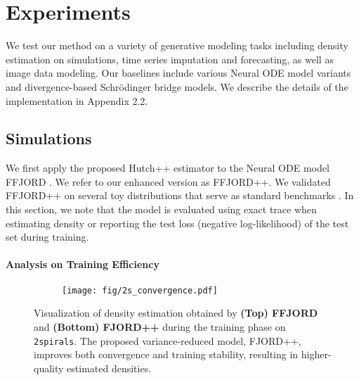 \section{Experiments}
We test our method on a variety of generative modeling tasks including density estimation on simulations, time series imputation and forecasting, as well as image data modeling. 
Our baselines include various Neural ODE model variants and divergence-based Schrödinger bridge models. We describe the details of the implementation in Appendix 2.2.

\subsection{Simulations}\label{sec: exp_simulation}
We first apply the proposed Hutch++ estimator to the Neural ODE model FFJORD \citep{FFJORD}. We refer to our enhanced version as FFJORD++.
We validated FFJORD++ on several toy distributions that serve as standard benchmarks \citep{FFJORD, wehenkel2019simulations1}. 
In this section, we note that the model is evaluated using exact trace when estimating density or reporting the test loss (negative log-likelihood) of the test set during training.

\paragraph{Analysis on Training Efficiency}
\begin{figure}[!t]
    \centering
    \begin{subfigure}[b]{0.48\textwidth}
        \centering
        \texttt{[image: fig/2s\_convergence.pdf]}
        \label{fig: 2s}
    \end{subfigure}
    \vspace{-5mm}
    \caption{\small Visualization of density estimation obtained by \textbf{(Top) FFJORD}  and \textbf{(Bottom) FJORD++} during the training phase on \texttt{2spirals}. The proposed variance-reduced model, FJORD++, improves both convergence and training stability, resulting in higher-quality estimated densities.}
    \vspace{-3mm}
    \label{fig: vis_train}
\end{figure}

